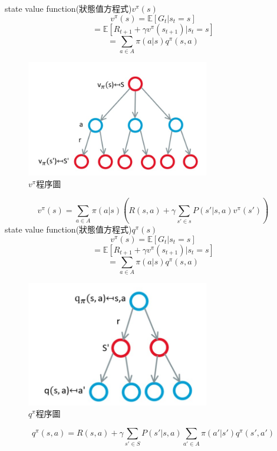 \documentclass[14pt,a4paper]{report}  %
\begin{document}
state value function(狀態值方程式)$v^{\pi}(s)$\\
$$v^{\pi}(s) = \mathbb{E}[G_t|s_t=s]$$
$$= \mathbb{E}[R_{t+1}+\gamma v^{\pi}(s_{t+1})|s_t=s]$$
$$= \sum_{a\in A}\pi (a|s)q^{\pi}(s, a)$$
\begin{figure}[hbt!]
\begin{center}
\includegraphics[width=8cm]{s_to _s}
\caption{$v^{\pi}$程序圖}
\label{fig.s_to_s}
\end{center}
\end{figure}
$$v^{\pi}(s) = \sum_{a\in A}\pi (a|s)(R(s, a)+\gamma \sum_{s'\in s}P(s'|s, a)v^{\pi}(s'))$$
state value function(狀態值方程式)$q^{\pi}(s)$
$$v^{\pi}(s) = \mathbb{E}[G_t|s_t=s]$$
$$= \mathbb{E}[R_{t+1}+\gamma v^{\pi}(s_{t+1})|s_t=s]$$
$$= \sum_{a\in A}\pi (a|s)q^{\pi}(s, a)$$
\begin{figure}[hbt!]
\begin{center}
\includegraphics[width=8cm]{Q_pi function}
\caption{$q^{\pi}$程序圖}
\label{fig.q_pi}
\end{center}
\end{figure}
$$q^\pi(s, a)=R(s, a)+\gamma\sum_{s'\in S}P(s'|s, a)\sum_{a'\in A}\pi(a'|s')q^{\pi}(s', a')$$
\newpage
\end{document}
